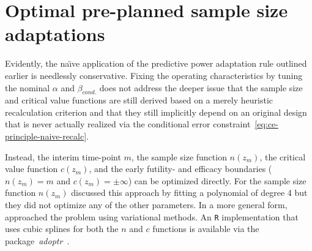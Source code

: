 \documentclass{article}
\begin{document}
\section{Optimal pre-planned sample size adaptations}
\label{sec:optimal-adaptation}

Evidently, the na\"{\i}ve application of the predictive power
adaptation rule outlined earlier is needlessly conservative.
Fixing the operating characteristics by tuning the nominal $\alpha$ and
$\beta_{cond.}$ does not address the deeper issue that the sample size and 
critical value functions are still derived based on a merely heuristic recalculation criterion and that 
they still implicitly depend on an original design that is never actually realized via the 
conditional error constraint~\eqref{eq:ce-principle-naive-recalc}.

Instead, the interim time-point $m$, 
the sample size function $n(z_m)$, 
the critical value function $c(z_m)$,
and the early futility- and efficacy boundaries 
($n(z_m)=m$ and $ c(z_m)=\pm\infty$)
can be optimized directly.
For the sample size function $n(z_m)$ \citet{brannath2004} discussed this approach by fitting a polynomial of degree 4 but they did not optimize
any of the other parameters.
In a more general form, \citet{pilz2019} approached the problem using
variational methods.
An \texttt{R} implementation that uses cubic splines for both the $n$ and
$c$ functions is available via the package~\textit{adoptr}~\citep{adoptrjss2020}.
\end{document}
